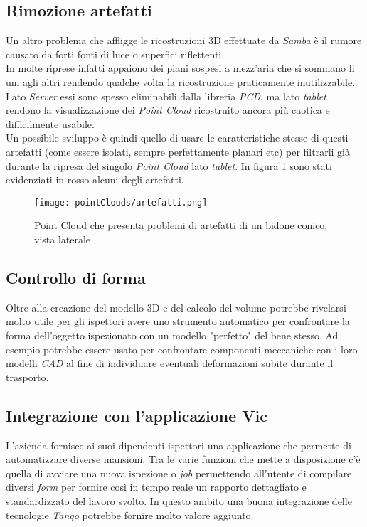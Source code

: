 \subsection{Rimozione artefatti}
Un altro problema che affligge le ricostruzioni 3D effettuate da \emph{Samba} è il rumore causato da forti fonti di luce o superfici riflettenti.\\
In molte riprese infatti appaiono dei piani sospesi a mezz'aria che si sommano li uni agli altri rendendo qualche volta la ricostruzione praticamente inutilizzabile. Lato \emph{Server} essi sono spesso eliminabili dalla libreria \emph{PCD}, ma lato \emph{tablet} rendono la visualizzazione dei \emph{Point Cloud} ricostruito ancora più caotica e difficilmente usabile.\\
Un possibile sviluppo è quindi quello di usare le caratteristiche stesse di questi artefatti (come essere isolati, sempre perfettamente planari etc) per filtrarli già durante la ripresa del singolo \emph{Point Cloud} lato \emph{tablet}. In figura \ref{figure:pcloud_artifacts} sono stati evidenziati in rosso alcuni degli artefatti.
\begin{figure}[H] 
    \centering 
    \texttt{[image: pointClouds/artefatti.png]} 
    \caption{Point Cloud che presenta problemi di artefatti di un bidone conico, vista laterale}
    \label{figure:pcloud_artifacts}
\end{figure}

\subsection{Controllo di forma}
Oltre alla creazione del modello 3D e del calcolo del volume potrebbe rivelarsi molto utile per gli ispettori avere uno strumento automatico per confrontare la forma dell'oggetto ispezionato con un modello "perfetto" del bene stesso. Ad esempio potrebbe essere usato per confrontare componenti meccaniche con i loro modelli \emph{CAD} al fine di individuare eventuali deformazioni subite durante il trasporto.

\subsection{Integrazione con l'applicazione Vic}
L'azienda fornisce ai suoi dipendenti ispettori una applicazione che permette di automatizzare diverse mansioni. Tra le varie funzioni che mette a disposizione c'è quella di avviare una nuova ispezione o \emph{job} permettendo all'utente di compilare diversi \emph{form} per fornire così in tempo reale un rapporto dettagliato e standardizzato del lavoro svolto. In questo ambito una buona integrazione delle tecnologie \emph{Tango} potrebbe fornire molto valore aggiunto.


